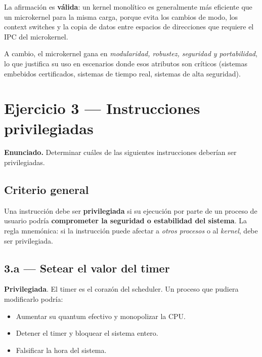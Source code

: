 \documentclass[11pt,a4paper]{article}
\begin{document}
\begin{respuesta}
La afirmación es \textbf{válida}: un kernel monolítico es
generalmente más eficiente que un microkernel para la misma carga,
porque evita los cambios de modo, los context switches y la copia
de datos entre espacios de direcciones que requiere el IPC del
microkernel.

A cambio, el microkernel gana en \emph{modularidad, robustez,
seguridad y portabilidad}, lo que justifica su uso en escenarios
donde esos atributos son críticos (sistemas embebidos certificados,
sistemas de tiempo real, sistemas de alta seguridad).
\end{respuesta}

\section{Ejercicio 3 --- Instrucciones privilegiadas}

\textbf{Enunciado.} Determinar cuáles de las siguientes instrucciones
deberían ser privilegiadas.

\subsection*{Criterio general}

Una instrucción debe ser \textbf{privilegiada} si su ejecución por
parte de un proceso de usuario podría \textbf{comprometer la
seguridad o estabilidad del sistema}. La regla mnemónica: si la
instrucción puede afectar a \emph{otros procesos} o al \emph{kernel},
debe ser privilegiada.

\subsection*{3.a --- Setear el valor del timer}

\begin{respuesta}
\textbf{Privilegiada}. El timer es el corazón del scheduler. Un
proceso que pudiera modificarlo podría:

\begin{itemize}[leftmargin=*,nosep]
    \item Aumentar su quantum efectivo y monopolizar la CPU.
    \item Detener el timer y bloquear el sistema entero.
    \item Falsificar la hora del sistema.
\end{itemize}
\end{respuesta}
\end{document}
